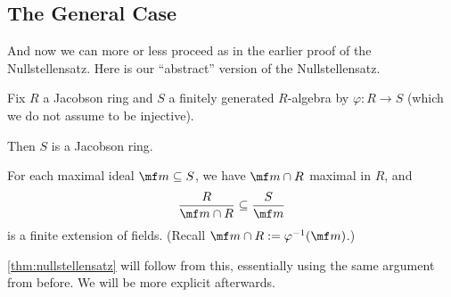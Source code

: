 \documentclass[../notes.tex]{subfiles}
\begin{document}
\subsection{The General Case}
And now we can more or less proceed as in the earlier proof of the Nullstellensatz. Here is our ``abstract'' version of the Nullstellensatz.
\begin{theorem} \label{thm:gennullstellensatz}
	Fix $R$ a Jacobson ring and $S$ a finitely generated $R$-algebra by $\varphi:R\to S$ (which we do not assume to be injective).
	\begin{listalph}
		\item Then $S$ is a Jacobson ring.
		\item For each maximal ideal $\mf m\subseteq S$, we have $\mf m\cap R$ maximal in $R$, and
		\[\frac R{\mf m\cap R}\subseteq\frac S{\mf m}\]
		is a finite extension of fields. (Recall $\mf m\cap R:=\varphi^{-1}(\mf m)$.)
	\end{listalph}
\end{theorem}
\autoref{thm:nullstellensatz} will follow from this, essentially using the same argument from before. We will be more explicit afterwards.
\end{document}
